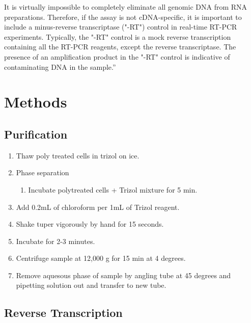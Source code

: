 \documentclass[journal, a4paper]{IEEEtran}
\begin{document}
It is virtually impossible to completely eliminate all genomic DNA from RNA preparations. Therefore, if the assay is not cDNA-specific, it is important to include a minus-reverse transcriptase ("-RT") control in real-time RT-PCR experiments. Typically, the "-RT" control is a mock reverse transcription containing all the RT-PCR reagents, except the reverse transcriptase. The presence of an amplification product in the "-RT" control is indicative of contaminating DNA in the sample.”

\section{Methods}
    \subsection{Purification}

      \begin{enumerate}
        \item Thaw poly treated cells in trizol on ice.
        \item Phase separation
        \begin{enumerate}
          \item Incubate polytreated cells + Trizol mixture for 5 min.
        \end{enumerate}
        \item Add 0.2mL of chloroform per 1mL of Trizol reagent.
        \item Shake tuper vigorously by hand for 15 seconds.
        \item Incubate for 2-3 minutes.
        \item Centrifuge sample at 12,000 g for 15 min at 4 degrees.
        \item Remove aquesous phase of sample by angling tube at 45 degrees and pipetting solution out and transfer to new tube.

      \end{enumerate}

    \subsection{Reverse Transcription}
\end{document}
